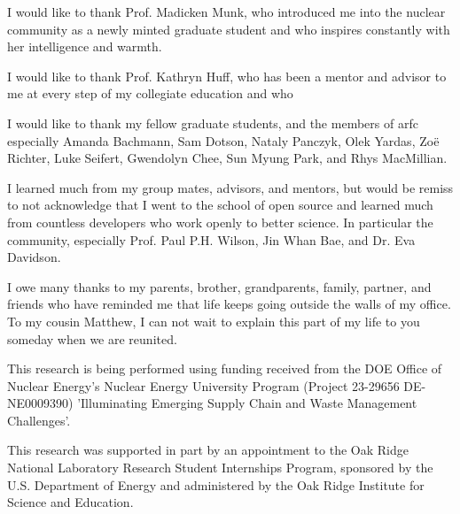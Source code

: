 I would like to thank Prof. Madicken Munk, who introduced me into
the nuclear community as a newly minted graduate student and who inspires
constantly with her intelligence and warmth.

I would like to thank Prof. Kathryn Huff, who has been a mentor and advisor to
me at every step of my collegiate education and who

I would like to thank my fellow graduate students, and the members of
\gls{arfc} especially Amanda Bachmann, Sam Dotson, Nataly Panczyk, Olek Yardas,
Zo\"{e} Richter, Luke Seifert, Gwendolyn Chee, Sun Myung Park, and Rhys MacMillian.

I learned much from my group mates, advisors, and mentors, but would be
remiss to not acknowledge that I went to the school of open source and
learned much from countless developers who work openly to better science. In
particular the \cyclus community, especially Prof. Paul P.H. Wilson, Jin Whan
Bae, and Dr. Eva Davidson.

I owe many thanks to my parents, brother, grandparents, family, partner, and
friends who have reminded me that life keeps going outside the walls of my
office. To my cousin Matthew, I can not wait to explain this part of my life to
you someday when we are reunited.

This research is being performed using funding received from the DOE Office of
Nuclear Energy's Nuclear Energy University Program (Project 23-29656
DE-NE0009390) 'Illuminating Emerging Supply Chain and Waste Management
Challenges'.

This research was supported in part by an appointment to the Oak Ridge National
Laboratory Research Student Internships Program, sponsored by the U.S.
Department of Energy and administered by the Oak Ridge Institute for Science
and Education.